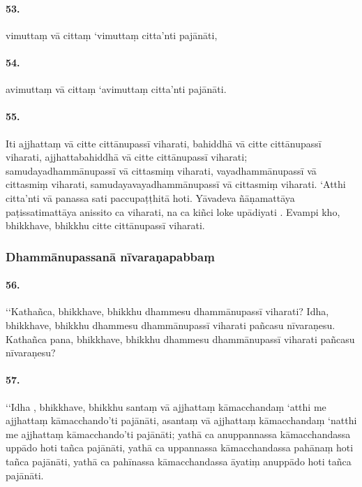 \paragraph{53.} vimuttaṃ vā cittaṃ ‘vimuttaṃ citta’nti pajānāti,

\paragraph{54.} avimuttaṃ vā cittaṃ ‘avimuttaṃ citta’nti pajānāti.

\paragraph{55.} Iti ajjhattaṃ vā citte cittānupassī viharati, bahiddhā vā citte cittānupassī viharati, ajjhattabahiddhā vā citte cittānupassī viharati; samudayadhammānupassī vā cittasmiṃ viharati, vayadhammānupassī vā cittasmiṃ viharati, samudayavayadhammānupassī vā cittasmiṃ viharati. ‘Atthi citta’nti vā panassa sati paccupaṭṭhitā hoti. Yāvadeva ñāṇamattāya paṭissatimattāya anissito ca viharati, na ca kiñci loke upādiyati . Evampi kho, bhikkhave, bhikkhu citte cittānupassī viharati.


\subsubsection{Dhammānupassanā nīvaraṇapabbaṃ}

\paragraph{56.} ‘‘Kathañca, bhikkhave, bhikkhu dhammesu dhammānupassī viharati? Idha, bhikkhave, bhikkhu dhammesu dhammānupassī viharati pañcasu nīvaraṇesu. Kathañca pana, bhikkhave, bhikkhu dhammesu dhammānupassī viharati pañcasu nīvaraṇesu?

\paragraph{57.} ‘‘Idha , bhikkhave, bhikkhu santaṃ vā ajjhattaṃ kāmacchandaṃ ‘atthi me ajjhattaṃ kāmacchando’ti pajānāti, asantaṃ vā ajjhattaṃ kāmacchandaṃ ‘natthi me ajjhattaṃ kāmacchando’ti pajānāti; yathā ca anuppannassa kāmacchandassa uppādo hoti tañca pajānāti, yathā ca uppannassa kāmacchandassa pahānaṃ hoti tañca pajānāti, yathā ca pahīnassa kāmacchandassa āyatiṃ anuppādo hoti tañca pajānāti.

